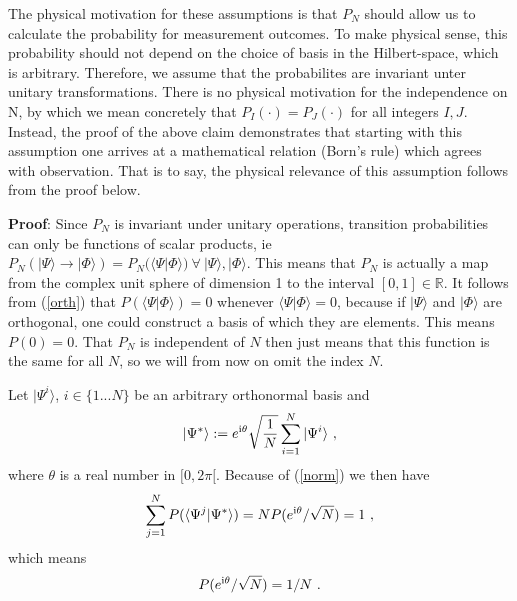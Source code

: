 \documentclass[12pt]{article}
\def\beqn{\begin{eqnarray}}
\def\eeqn{\end{eqnarray}}
\begin{document}
The physical motivation for these assumptions is that $P_N$ should allow us to calculate the probability for measurement outcomes. To make physical sense, this probability should not depend on the choice of basis in the Hilbert-space, which is arbitrary. Therefore, we assume that the probabilites are invariant unter unitary transformations. There is no physical motivation for the independence on N, by which we mean concretely that $P_I(\cdot) = P_J(\cdot)$ for all integers $I,J$. Instead, the proof of the above claim demonstrates that starting with this assumption one arrives at a mathematical relation (Born’s rule) which agrees with observation. That is to say, the physical relevance of this assumption follows from the proof below.

\bigskip

{\bf Proof}: Since $P_N$ is invariant under unitary operations, transition probabilities can only be functions of scalar products, ie 
$P_N(|\Psi \rangle \to |\Phi \rangle)  = P_N(\langle \Psi |\Phi \rangle) ~ \forall ~ |\Psi \rangle, |\Phi \rangle$. This means that $P_N$ is actually a map from the complex unit sphere of dimension 1 to the interval $[ 0,1] \in {\mathbb{R}}$. It follows from (\ref{orth}) that $P(\langle \Psi | \Phi \rangle) = 0$ whenever $\langle \Psi | \Phi \rangle =0$, because if $|\Psi \rangle$ and $|\Phi \rangle$ are orthogonal, one could construct a basis of which they are elements. This means $P(0) = 0$. That $P_N$ is independent of $N$ then just means that this function is the same for all $N$, so we will from now on omit the index $N$. 

Let $|\Psi^i \rangle$, $i \in \{1... N \}$ be an arbitrary orthonormal basis and
\beqn
|\Psi^* \rangle := e^{{\rm i} \theta} \sqrt{\frac{1}{N}} \sum_{i=1}^N |\Psi^i \rangle~,
\eeqn
where $\theta$ is a real number in $[0,2 \pi [$. Because of (\ref{norm}) we then have
\beqn
\sum_{j=1}^N P (\langle \Psi^j | \Psi^* \rangle)  = N  P( e^{{\rm i} \theta}/\sqrt{N}) =  1~,
\eeqn
which means
\beqn
P( e^{{\rm i} \theta} /\sqrt{N}) = 1/N ~. \label{1/N}
\eeqn
\end{document}
